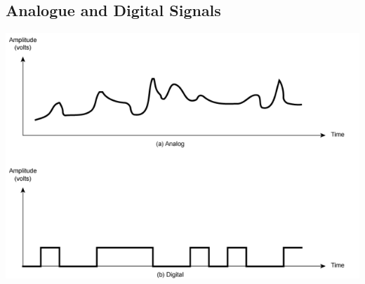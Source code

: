 \documentclass[11pt]{article}
\begin{document}
\subsection{Analogue and Digital Signals}
\includegraphics[width=\textwidth]{analog-and-ditigal-signals}
\end{document}
